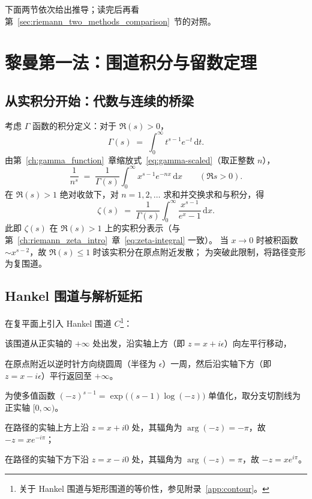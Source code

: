 下面两节依次给出推导；读完后再看第~\ref{sec:riemann_two_methods_comparison}~节的对照。

\section{黎曼第一法：围道积分与留数定理}\label{sec:riemann_first_method}

\subsection{从实积分开始：代数与连续的桥梁}

考虑 $\Gamma$ 函数的积分定义：对于 $\Re(s)>0$，
\[
  \Gamma(s) \;=\;  \int_0^{\infty} t^{s-1} e^{-t} \,\mathrm{d}t.
\]
由第~\ref{ch:gamma_function}~章缩放式~\eqref{eq:gamma-scaled}（取正整数 $n$），
\[
  \frac{1}{n^s}
  \;=\;
  \frac{1}{\Gamma(s)} \int_0^{\infty} x^{s-1} e^{-nx} \,\mathrm{d}x
  \qquad(\Re s>0).
\]
在 $\Re(s)>1$ 绝对收敛下，对 $n=1,2,\ldots$ 求和并交换求和与积分，得
\begin{equation}
\label{eq:zeta_integral_1}
  \zeta(s)
  \;=\;
  \frac{1}{\Gamma(s)} \int_0^{\infty} \frac{x^{s-1}}{e^x - 1} \,\mathrm{d}x.
\end{equation}
此即 $\zeta(s)$ 在 $\Re(s)>1$ 上的实积分表示（与第~\ref{ch:riemann_zeta_intro}~章~\eqref{eq:zeta-integral} 一致）。
当 $x\to 0$ 时被积函数 $\sim x^{s-2}$，故 $\Re(s)\le 1$ 时该实积分在原点附近发散；
为突破此限制，将路径变形为复围道。

\subsection{Hankel 围道与解析延拓}

在复平面上引入 Hankel 围道 $C$\footnote{关于 Hankel 围道与矩形围道的等价性，参见附录~\ref{app:contour}。}：

该围道从正实轴的 $+\infty$ 处出发，沿实轴上方（即 $z = x + i\epsilon$）向左平行移动，

在原点附近以逆时针方向绕圆周（半径为 $\epsilon$）一周，然后沿实轴下方（即 $z = x - i\epsilon$）平行返回至 $+\infty$。

为使多值函数 $(-z)^{s-1}=\exp\big((s-1)\log(-z)\big)$ 单值化，取分支切割线为正实轴 $[0,\infty)$。

在路径的实轴上方上沿 $z = x + i0$ 处，其辐角为 $\arg(-z) = -\pi$，故 $-z = x e^{-i\pi}$；

在路径的实轴下方下沿 $z = x - i0$ 处，其辐角为 $\arg(-z) = \pi$，故 $-z = x e^{i\pi}$。

